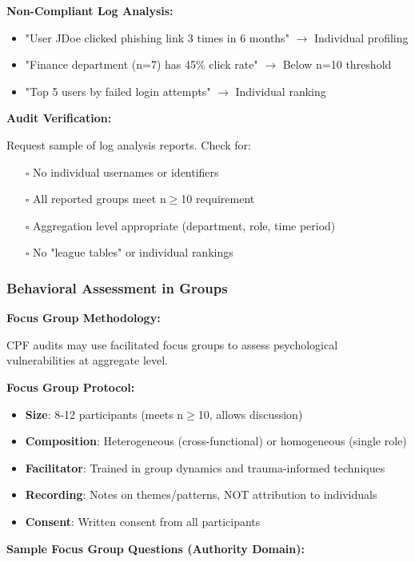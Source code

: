 \documentclass[11pt,a4paper]{article}
\begin{document}
\textbf{Non-Compliant Log Analysis:}

\begin{itemize}
\item "User JDoe clicked phishing link 3 times in 6 months" $\rightarrow$ Individual profiling
\item "Finance department (n=7) has 45\% click rate" $\rightarrow$ Below n=10 threshold
\item "Top 5 users by failed login attempts" $\rightarrow$ Individual ranking
\end{itemize}

\textbf{Audit Verification:}

Request sample of log analysis reports. Check for:
\begin{itemize}
\item[$\square$] No individual usernames or identifiers
\item[$\square$] All reported groups meet n$\geq$10 requirement
\item[$\square$] Aggregation level appropriate (department, role, time period)
\item[$\square$] No "league tables" or individual rankings
\end{itemize}

\subsubsection{Behavioral Assessment in Groups}

\textbf{Focus Group Methodology:}

CPF audits may use facilitated focus groups to assess psychological vulnerabilities at aggregate level.

\textbf{Focus Group Protocol:}
\begin{itemize}
\item \textbf{Size}: 8-12 participants (meets n$\geq$10, allows discussion)
\item \textbf{Composition}: Heterogeneous (cross-functional) or homogeneous (single role)
\item \textbf{Facilitator}: Trained in group dynamics and trauma-informed techniques
\item \textbf{Recording}: Notes on themes/patterns, NOT attribution to individuals
\item \textbf{Consent}: Written consent from all participants
\end{itemize}

\textbf{Sample Focus Group Questions (Authority Domain):}
\end{document}
